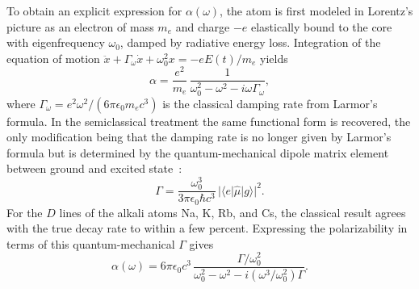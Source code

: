 To obtain an explicit expression for $\alpha(\omega)$, the atom is first modeled in Lorentz's picture as an electron of mass $m_e$ and charge $-e$ elastically bound to the core with eigenfrequency $\omega_0$, damped by radiative energy loss. Integration of the equation of motion $\ddot{x} + \Gamma_\omega\dot{x} + \omega_0^2 x = -eE(t)/m_e$ yields~\cite{Grimm:00}
\begin{equation}
\alpha = \frac{e^2}{m_e}\,\frac{1}{\omega_0^2 - \omega^2 - i\omega\Gamma_\omega},
\label{eq:polarizability_lorentz}
\end{equation}
where $\Gamma_\omega = e^2\omega^2/(6\pi\epsilon_0 m_e c^3)$ is the classical damping rate from Larmor's formula. In the semiclassical treatment the same functional form is recovered, the only modification being that the damping rate is no longer given by Larmor's formula but is determined by the quantum-mechanical dipole matrix element between ground and excited state~\cite{Grimm:00}:
\begin{equation}
\Gamma = \frac{\omega_0^3}{3\pi\epsilon_0\hbar c^3}\,|\langle e|\hat{\mu}|g\rangle|^2.
\label{eq:gamma_quantum}
\end{equation}
For the $D$ lines of the alkali atoms Na, K, Rb, and Cs, the classical result agrees with the true decay rate to within a few percent. Expressing the polarizability in terms of this quantum-mechanical $\Gamma$ gives~\cite{Grimm:00}
\begin{equation}
\alpha(\omega) = 6\pi\epsilon_0 c^3\,\frac{\Gamma/\omega_0^2}{\omega_0^2 - \omega^2 - i(\omega^3/\omega_0^2)\Gamma}.
\label{eq:polarizability}
\end{equation}

